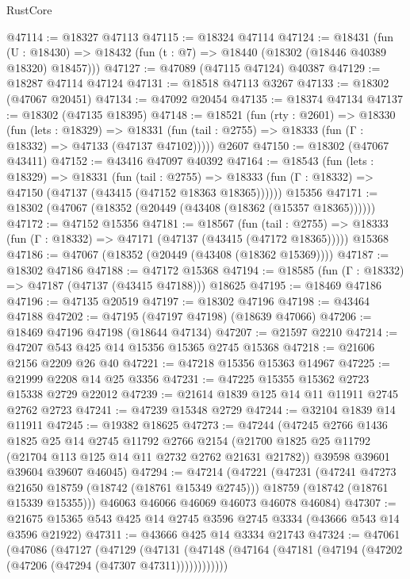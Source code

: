 \begin{lexlean}{RustCore}
\begin{coremodule}
@47114 := @18327 @47113
@47115 := @18324 @47114
@47124 := @18431
    (fun (U : @18430) => @18432 (fun (t : @7) => @18440 (@18302 (@18446 @40389 @18320) @18457)))
@47127 := @47089 (@47115 @47124) @40387
@47129 := @18287 @47114 @47124
@47131 := @18518 @47113 @3267
@47133 := @18302 (@47067 @20451)
@47134 := @47092 @20454
@47135 := @18374 @47134
@47137 := @18302 (@47135 @18395)
@47148 := @18521
    (fun (rty : @2601) =>
    @18330
      (fun (lets : @18329) =>
      @18331 (fun (tail : @2755) => @18333 (fun (Γ : @18332) => @47133 (@47137 @47102)))))
    @2607
@47150 := @18302 (@47067 @43411)
@47152 := @43416 @47097 @40392
@47164 := @18543
    (fun (lets : @18329) =>
    @18331
      (fun (tail : @2755) =>
      @18333 (fun (Γ : @18332) => @47150 (@47137 (@43415 (@47152 @18363 @18365))))))
    @15356
@47171 := @18302 (@47067 (@18352 (@20449 (@43408 (@18362 (@15357 @18365))))))
@47172 := @47152 @15356
@47181 := @18567
    (fun (tail : @2755) => @18333 (fun (Γ : @18332) => @47171 (@47137 (@43415 (@47172 @18365)))))
    @15368
@47186 := @47067 (@18352 (@20449 (@43408 (@18362 @15369))))
@47187 := @18302 @47186
@47188 := @47172 @15368
@47194 := @18585 (fun (Γ : @18332) => @47187 (@47137 (@43415 @47188))) @18625
@47195 := @18469 @47186
@47196 := @47135 @20519
@47197 := @18302 @47196
@47198 := @43464 @47188
@47202 := @47195 (@47197 @47198) (@18639 @47066)
@47206 := @18469 @47196 @47198 (@18644 @47134)
@47207 := @21597 @2210
@47214 := @47207 @543 @425 @14 @15356 @15365 @2745 @15368
@47218 := @21606 @2156 @2209 @26 @40
@47221 := @47218 @15356 @15363 @14967
@47225 := @21999 @2208 @14 @25 @3356
@47231 := @47225 @15355 @15362 @2723 @15338 @2729 @22012
@47239 := @21614 @1839 @125 @14 @11 @11911 @2745 @2762 @2723
@47241 := @47239 @15348 @2729
@47244 := @32104 @1839 @14 @11911
@47245 := @19382 @18625
@47273 := @47244
    (@47245
      @2766
      @1436
      @1825
      @25
      @14
      @2745
      @11792
      @2766
      @2154
      (@21700 @1825 @25 @11792 (@21704 @113 @125 @14 @11 @2732 @2762 @21631 @21782))
      @39598
      @39601
      @39604
      @39607
      @46045)
@47294 := @47214
    (@47221
      (@47231
        (@47241 @47273 @21650 @18759 (@18742 (@18761 @15349 @2745)))
        @18759
        (@18742 (@18761 @15339 @15355)))
      @46063
      @46066
      @46069
      @46073
      @46078
      @46084)
@47307 := @21675 @15365 @543 @425 @14 @2745 @3596 @2745 @3334 (@43666 @543 @14 @3596 @21922)
@47311 := @43666 @425 @14 @3334 @21743
@47324 := @47061
    (@47086
      (@47127
        (@47129
          (@47131 (@47148 (@47164 (@47181 (@47194 (@47202 (@47206 (@47294 (@47307 @47311))))))))))))

\end{coremodule}
\end{lexlean}
